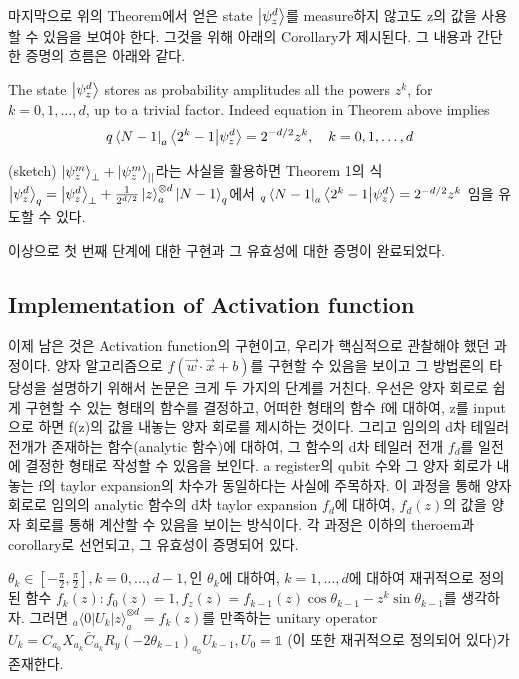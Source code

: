 마지막으로 위의 Theorem에서 얻은 state \(\ket{\psi_z^d}\)를 measure하지 않고도 z의 값을 사용할 수 있음을 보여야 한다.
그것을 위해 아래의 Corollary가 제시된다. 그 내용과 간단한 증명의 흐름은 아래와 같다.

\begin{corollary}
    The state $\ket{\psi_z^d}$ stores as probability amplitudes all the powers $z^k$, for $k = 0, 1, \ldots, d$, up to a trivial factor. Indeed equation in Theorem above implies
\[
q \bra{N - 1}_a \bra{2^k - 1} \ket{\psi_z^d} = 2^{-d/2} z^k, \quad k = 0, 1, \ldots, d
\]
\end{corollary}

\begin{pf}(sketch)
    \(\ket{\psi_z^m}_\perp + \ket{\psi_z^m}_{||}\)라는 사실을 활용하면
    Theorem 1의 식 \(\ket{\psi_z^d}_q = \ket{\psi_z^d}_\perp + \frac{1}{2^{d/2}}\ket{z}_a^{\otimes d}\ket{N-1}_q\)에서 \(_q\bra{N-1}_a\bra{2^k-1}\ket{\psi_z^d} = 2^{-d/2}z^k\) 임을 유도할 수 있다.
\end{pf}

이상으로 첫 번째 단계에 대한 구현과 그 유효성에 대한 증명이 완료되었다.

\subsection{Implementation of Activation function}

이제 남은 것은 Activation function의 구현이고, 우리가 핵심적으로 관찰해야 했던 과정이다.
양자 알고리즘으로 \(f(\vec{w}\cdot\vec{x}+b)\)를 구현할 수 있음을 보이고 그 방법론의 타당성을 설명하기 위해서 논문은 크게 두 가지의 단계를 거친다.
우선은 양자 회로로 쉽게 구현할 수 있는 형태의 함수를 결정하고,
어떠한 형태의 함수 f에 대하여, z를 input으로 하면 f(z)의 값을 내놓는 양자 회로를 제시하는 것이다.
그리고 임의의 d차 테일러 전개가 존재하는 함수(analytic 함수)에 대하여, 그 함수의 d차 테일러 전개 \(f_d\)를 일전에 결정한 형태로 작성할 수 있음을 보인다.
a register의 qubit 수와 그 양자 회로가 내놓는 f의 taylor expansion의 차수가 동일하다는 사실에 주목하자.
이 과정을 통해 양자 회로로 임의의 analytic 함수의 d차 taylor expansion \(f_d\)에 대하여, \(f_d(z)\)의 값을 양자 회로를 통해 계산할 수 있음을 보이는 방식이다.
각 과정은 이하의 theroem과 corollary로 선언되고, 그 유효성이 증명되어 있다.

\begin{theorem}
    \(\theta_{k} \in [-\frac{\pi}{2},\frac{\pi}{2}], k = 0,\dots,d-1,\)인 \(\theta_{k}\)에 대하여, \(k = 1,\dots,d\)에 대하여 재귀적으로 정의된 함수 \(f_k(z): f_0(z) = 1, f_z(z) = f_{k-1}(z)\cos\theta_{k-1} - z^k\sin\theta_{k-1}\)를 생각하자.
    그러면 \(_a \langle  0|U_k|z \rangle  _a^{\otimes d} = f_k(z)\)를 만족하는 unitary operator \(U_k = C_{a_0}X_{a_k}\bar{C}_{a_k}R_y(-2\theta_{k-1})_{a_0}U_{k-1}, U_0 = \mathbb{1} \) (이 또한 재귀적으로 정의되어 있다)가 존재한다.
\end{theorem}

